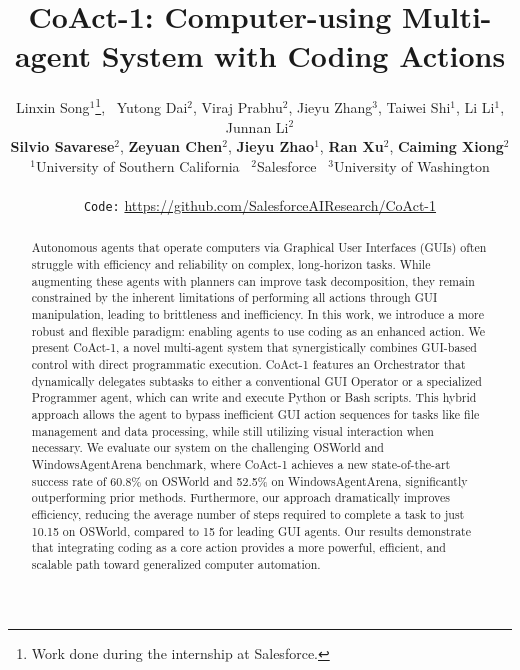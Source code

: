 \documentclass{article} %
\title{CoAct-1: Computer-using Multi-agent System with Coding Actions}
\author{Linxin Song$^1$\thanks{Work done during the internship at Salesforce.}, \ Yutong Dai$^2$, Viraj Prabhu$^2$, Jieyu Zhang$^3$, Taiwei Shi$^1$, Li Li$^1$, Junnan Li$^2$\\ 
\textbf{Silvio Savarese}$^2$, \textbf{Zeyuan Chen}$^2$, \textbf{Jieyu Zhao}$^1$, \textbf{Ran Xu}$^2$, \textbf{Caiming Xiong}$^2$ \\
$^1$University of Southern California \ $^2$Salesforce \ $^3$University of Washington  \\
\\
\texttt{Code:} \url{https://github.com/SalesforceAIResearch/CoAct-1}
}
\newcommand{\ours}{CoAct-1\xspace}
\begin{document}
\maketitle
\begin{abstract}
Autonomous agents that operate computers via Graphical User Interfaces (GUIs) often struggle with efficiency and reliability on complex, long-horizon tasks. While augmenting these agents with planners can improve task decomposition, they remain constrained by the inherent limitations of performing all actions through GUI manipulation, leading to brittleness and inefficiency. In this work, we introduce a more robust and flexible paradigm: enabling agents to use coding as an enhanced action. We present \ours, a novel multi-agent system that synergistically combines GUI-based control with direct programmatic execution. \ours features an Orchestrator that dynamically delegates subtasks to either a conventional GUI Operator or a specialized Programmer agent, which can write and execute Python or Bash scripts. This hybrid approach allows the agent to bypass inefficient GUI action sequences for tasks like file management and data processing, while still utilizing visual interaction when necessary. We evaluate our system on the challenging OSWorld and WindowsAgentArena benchmark, where \ours achieves a new state-of-the-art success rate of 60.8\% on OSWorld and 52.5\% on WindowsAgentArena, significantly outperforming prior methods. Furthermore, our approach dramatically improves efficiency, reducing the average number of steps required to complete a task to just 10.15 on OSWorld, compared to 15 for leading GUI agents. Our results demonstrate that integrating coding as a core action provides a more powerful, efficient, and scalable path toward generalized computer automation.
\end{abstract}
\end{document}
